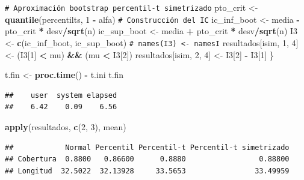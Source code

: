 \documentclass[
]{book}
\newenvironment{Shaded}{\begin{snugshade}}{\end{snugshade}}
\newcommand{\CommentTok}[1]{\textcolor[rgb]{0.56,0.35,0.01}{\textit{#1}}}
\newcommand{\DecValTok}[1]{\textcolor[rgb]{0.00,0.00,0.81}{#1}}
\newcommand{\FunctionTok}[1]{\textcolor[rgb]{0.13,0.29,0.53}{\textbf{#1}}}
\newcommand{\NormalTok}[1]{#1}
\newcommand{\OtherTok}[1]{\textcolor[rgb]{0.56,0.35,0.01}{#1}}
\newcommand{\SpecialCharTok}[1]{\textcolor[rgb]{0.81,0.36,0.00}{\textbf{#1}}}
\theoremstyle{break}
\theoremstyle{nonumberplain}
\renewcommand{\CommentTok}[1]{\textcolor[rgb]{0.41,0.41,0.41}{\texttt{#1}}}
\begin{document}
\begin{Shaded}
\begin{Highlighting}[]
    \CommentTok{\# Aproximación bootstrap percentil{-}t simetrizado}
\NormalTok{    pto\_crit }\OtherTok{\textless{}{-}} \FunctionTok{quantile}\NormalTok{(percentilts, }\DecValTok{1} \SpecialCharTok{{-}}\NormalTok{ alfa)}
    \CommentTok{\# Construcción del IC}
\NormalTok{    ic\_inf\_boot }\OtherTok{\textless{}{-}}\NormalTok{ media }\SpecialCharTok{{-}}\NormalTok{ pto\_crit }\SpecialCharTok{*}\NormalTok{ desv}\SpecialCharTok{/}\FunctionTok{sqrt}\NormalTok{(n)}
\NormalTok{    ic\_sup\_boot }\OtherTok{\textless{}{-}}\NormalTok{ media }\SpecialCharTok{+}\NormalTok{ pto\_crit }\SpecialCharTok{*}\NormalTok{ desv}\SpecialCharTok{/}\FunctionTok{sqrt}\NormalTok{(n)}
\NormalTok{    I3 }\OtherTok{\textless{}{-}} \FunctionTok{c}\NormalTok{(ic\_inf\_boot, ic\_sup\_boot)}
    \CommentTok{\# names(I3) \textless{}{-} namesI}
\NormalTok{    resultados[isim, }\DecValTok{1}\NormalTok{, }\DecValTok{4}\NormalTok{] }\OtherTok{\textless{}{-}}\NormalTok{ (I3[}\DecValTok{1}\NormalTok{] }\SpecialCharTok{\textless{}}\NormalTok{ mu) }\SpecialCharTok{\&\&}\NormalTok{ (mu }\SpecialCharTok{\textless{}}\NormalTok{ I3[}\DecValTok{2}\NormalTok{])}
\NormalTok{    resultados[isim, }\DecValTok{2}\NormalTok{, }\DecValTok{4}\NormalTok{] }\OtherTok{\textless{}{-}}\NormalTok{ I3[}\DecValTok{2}\NormalTok{] }\SpecialCharTok{{-}}\NormalTok{ I3[}\DecValTok{1}\NormalTok{]}
\NormalTok{\}}

\NormalTok{t.fin }\OtherTok{\textless{}{-}} \FunctionTok{proc.time}\NormalTok{() }\SpecialCharTok{{-}}\NormalTok{ t.ini}
\NormalTok{t.fin}
\end{Highlighting}
\end{Shaded}

\begin{verbatim}
##    user  system elapsed 
##    6.42    0.09    6.56
\end{verbatim}

\begin{Shaded}
\begin{Highlighting}[]
\FunctionTok{apply}\NormalTok{(resultados, }\FunctionTok{c}\NormalTok{(}\DecValTok{2}\NormalTok{, }\DecValTok{3}\NormalTok{), mean)}
\end{Highlighting}
\end{Shaded}

\begin{verbatim}
##            Normal Percentil Percentil-t Percentil-t simetrizado
## Cobertura  0.8800   0.86600      0.8880                 0.88800
## Longitud  32.5022  32.13928     33.5653                33.49959
\end{verbatim}
\end{document}
